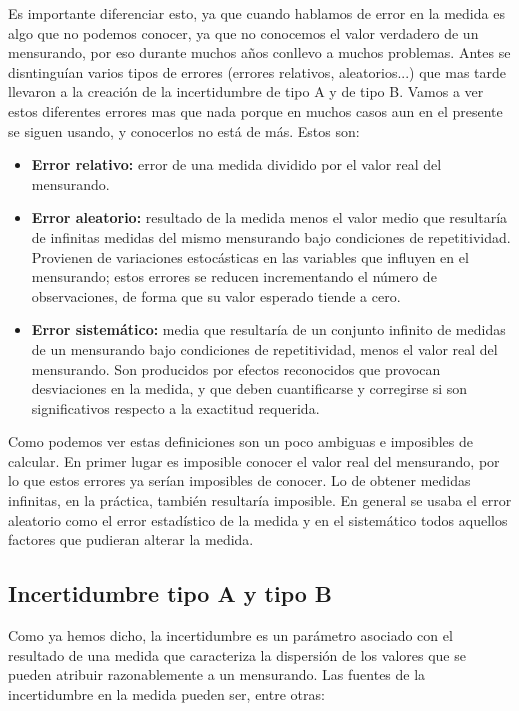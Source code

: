 \documentclass[12pt,a4paper]{book}
\begin{document}
Es importante diferenciar esto, ya que cuando hablamos de error en la medida es algo que no podemos conocer, ya que no conocemos el valor verdadero de un mensurando, por eso durante muchos años conllevo a muchos problemas. Antes se disntinguían varios tipos de errores (errores relativos, aleatorios...) que mas tarde llevaron a la creación de la incertidumbre de tipo A y de tipo B. Vamos a ver estos diferentes errores mas que nada porque en muchos casos aun en el presente se siguen usando, y conocerlos no está de más. Estos son:

\begin{itemize}
\item \textbf{Error relativo:} error de una medida dividido por el valor real del mensurando.

\item \textbf{Error aleatorio:} resultado de la medida menos el valor medio que resultaría de infinitas medidas del mismo mensurando bajo condiciones de repetitividad. Provienen de variaciones estocásticas en las variables que influyen en el mensurando; estos errores se reducen incrementando el número de observaciones, de forma que su valor esperado tiende a cero.

\item \textbf{Error sistemático:} media que resultaría de un conjunto infinito de medidas de un mensurando bajo condiciones de repetitividad, menos el valor real del mensurando. Son producidos por efectos reconocidos que provocan desviaciones en la medida, y que deben cuantificarse y corregirse si son significativos respecto a la exactitud requerida.
\end{itemize}

Como podemos ver estas definiciones son un poco ambiguas e imposibles de calcular. En primer lugar es imposible conocer el valor real del mensurando, por lo que estos errores ya serían imposibles de conocer. Lo de obtener medidas infinitas, en la práctica, también resultaría imposible. En general se usaba el error aleatorio como el error estadístico de la medida y en el sistemático todos aquellos factores que pudieran alterar la medida.  \\


\subsection{Incertidumbre tipo A y tipo B}
Como ya hemos dicho, la incertidumbre es un parámetro asociado con el resultado de una medida que caracteriza la dispersión de los valores que se pueden atribuir razonablemente a un mensurando. Las fuentes de la incertidumbre en la medida pueden ser, entre otras:
\end{document}
